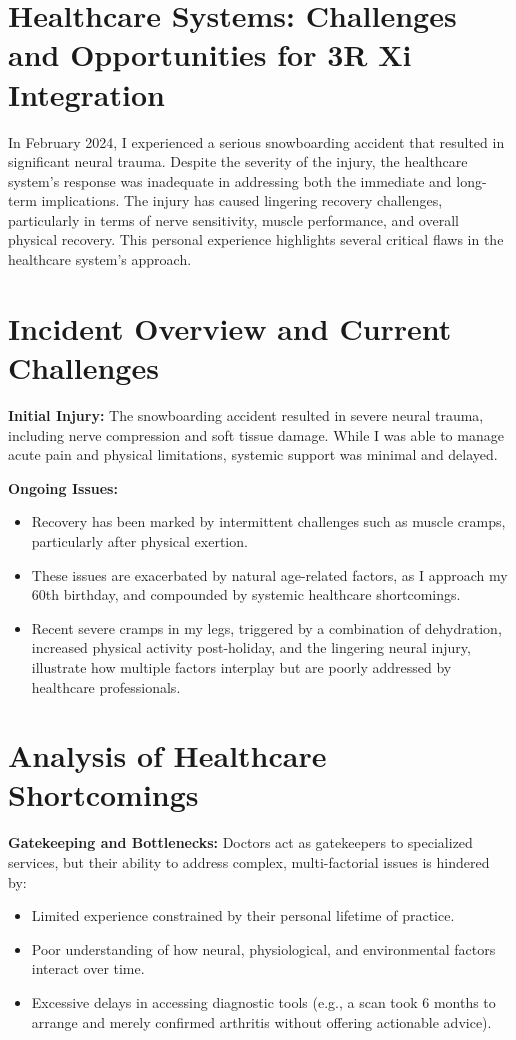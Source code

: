 \documentclass[a4paper,12pt]{article}
\begin{document}
\section*{Healthcare Systems: Challenges and Opportunities for 3R Xi Integration}

In February 2024, I experienced a serious snowboarding accident that resulted in significant neural trauma. Despite the severity of the injury, the healthcare system’s response was inadequate in addressing both the immediate and long-term implications. The injury has caused lingering recovery challenges, particularly in terms of nerve sensitivity, muscle performance, and overall physical recovery. This personal experience highlights several critical flaws in the healthcare system's approach.

\section*{Incident Overview and Current Challenges}

\textbf{Initial Injury:} The snowboarding accident resulted in severe neural trauma, including nerve compression and soft tissue damage. While I was able to manage acute pain and physical limitations, systemic support was minimal and delayed.

\textbf{Ongoing Issues:}
\begin{itemize}
    \item Recovery has been marked by intermittent challenges such as muscle cramps, particularly after physical exertion.
    \item These issues are exacerbated by natural age-related factors, as I approach my 60th birthday, and compounded by systemic healthcare shortcomings.
    \item Recent severe cramps in my legs, triggered by a combination of dehydration, increased physical activity post-holiday, and the lingering neural injury, illustrate how multiple factors interplay but are poorly addressed by healthcare professionals.
\end{itemize}

\section*{Analysis of Healthcare Shortcomings}

\textbf{Gatekeeping and Bottlenecks:}  
Doctors act as gatekeepers to specialized services, but their ability to address complex, multi-factorial issues is hindered by:
\begin{itemize}
    \item Limited experience constrained by their personal lifetime of practice.
    \item Poor understanding of how neural, physiological, and environmental factors interact over time.
    \item Excessive delays in accessing diagnostic tools (e.g., a scan took 6 months to arrange and merely confirmed arthritis without offering actionable advice).
\end{itemize}
\end{document}

